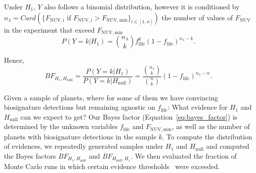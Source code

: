 \documentclass[twocolumn,twocolappendix,linenumbers]{aastex631}
\begin{document}
Under $H_1$, $Y$ also follows a binomial distribution, however it is conditioned by $n_{\lambda}=Card(\{F_\mathrm{NUV, i} \text{ if } F_\mathrm{NUV, i}>F_\mathrm{NUV, min}\}_{i \in [1,n]})$ the number of values of $F_\mathrm{NUV}$ in the experiment that exceed $F_\mathrm{NUV, min}$
\begin{equation}
P(Y=k|H_1) = \binom{n_{\lambda}}{k}f_\mathrm{life}^k(1-f_\mathrm{life})^{n_{\lambda}-k}.
\end{equation}

Hence,
\begin{equation}\label{eq:bayes_factor}
BF_{H_1,H_\mathrm{null}} = \frac{P(Y=k|H_1)}{P(Y=k|H_\mathrm{null})} = \frac{\binom{n_\lambda}{k}}{\binom{n}{k}}(1-f_\mathrm{life})^{n_{\lambda}-n}.
\end{equation}


Given a sample of planets, where for some of them we have convincing biosignature detections but remaining agnostic on $f_\mathrm{life}$: What evidence for $H_\mathrm{1}$ and $H_\mathrm{null}$ can we expect to get?
Our Bayes factor (Equation~\ref{eq:bayes_factor}) is determined by the unknown variables $f_\mathrm{life}$ and $F_\mathrm{NUV, min}$, as well as the number of planets with biosignature detections in the sample $k$.
To compute the distribution of evidences, we repeatedly generated samples under $H_\mathrm{1}$ and $H_\mathrm{null}$ and computed the Bayes factors $BF_{H_1,H_\mathrm{null}}$ and $BF_{H_\mathrm{null}, H_1}$.
We then evaluated the fraction of Monte Carlo runs in which certain evidence thresholds~\citep{Jeffreys1939} were exceeded.


\end{document}

